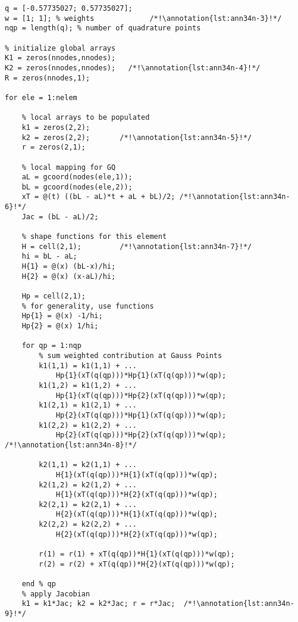 \begin{lstlisting}[style=myMatlab,name=lec34n-ex1]
% sample points for Gauss Quadrature
q = [-0.57735027; 0.57735027];
w = [1; 1]; % weights             /*!\annotation{lst:ann34n-3}!*/
nqp = length(q); % number of quadrature points

% initialize global arrays
K1 = zeros(nnodes,nnodes);
K2 = zeros(nnodes,nnodes);   /*!\annotation{lst:ann34n-4}!*/
R = zeros(nnodes,1);

for ele = 1:nelem
    
    % local arrays to be populated
    k1 = zeros(2,2);
    k2 = zeros(2,2);       /*!\annotation{lst:ann34n-5}!*/
    r = zeros(2,1);
    
    % local mapping for GQ
    aL = gcoord(nodes(ele,1));
    bL = gcoord(nodes(ele,2));
    xT = @(t) ((bL - aL)*t + aL + bL)/2; /*!\annotation{lst:ann34n-6}!*/
    Jac = (bL - aL)/2;

    % shape functions for this element
    H = cell(2,1);         /*!\annotation{lst:ann34n-7}!*/
    hi = bL - aL;
    H{1} = @(x) (bL-x)/hi;
    H{2} = @(x) (x-aL)/hi;

    Hp = cell(2,1);
    % for generality, use functions
    Hp{1} = @(x) -1/hi;
    Hp{2} = @(x) 1/hi;

    for qp = 1:nqp        
        % sum weighted contribution at Gauss Points
        k1(1,1) = k1(1,1) + ...
            Hp{1}(xT(q(qp)))*Hp{1}(xT(q(qp)))*w(qp);
        k1(1,2) = k1(1,2) + ...
            Hp{1}(xT(q(qp)))*Hp{2}(xT(q(qp)))*w(qp);
        k1(2,1) = k1(2,1) + ...
            Hp{2}(xT(q(qp)))*Hp{1}(xT(q(qp)))*w(qp);
        k1(2,2) = k1(2,2) + ...
            Hp{2}(xT(q(qp)))*Hp{2}(xT(q(qp)))*w(qp); /*!\annotation{lst:ann34n-8}!*/
        
        k2(1,1) = k2(1,1) + ...
            H{1}(xT(q(qp)))*H{1}(xT(q(qp)))*w(qp);
        k2(1,2) = k2(1,2) + ...
            H{1}(xT(q(qp)))*H{2}(xT(q(qp)))*w(qp);
        k2(2,1) = k2(2,1) + ...
            H{2}(xT(q(qp)))*H{1}(xT(q(qp)))*w(qp);
        k2(2,2) = k2(2,2) + ...
            H{2}(xT(q(qp)))*H{2}(xT(q(qp)))*w(qp);
        
        r(1) = r(1) + xT(q(qp))*H{1}(xT(q(qp)))*w(qp);
        r(2) = r(2) + xT(q(qp))*H{2}(xT(q(qp)))*w(qp);        

    end % qp
    % apply Jacobian
    k1 = k1*Jac; k2 = k2*Jac; r = r*Jac;  /*!\annotation{lst:ann34n-9}!*/
\end{lstlisting}

